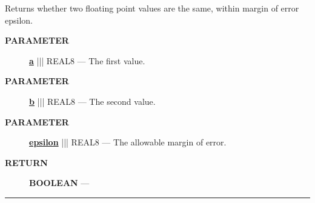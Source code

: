 \par





Returns whether two floating point values are the same, within margin of error epsilon.






\par
\begin{description}
\item [\colorbox{tagtype}{\color{white} \textbf{\textsf{PARAMETER}}}] \textbf{\underline{a}} ||| REAL8 --- The first value.
\item [\colorbox{tagtype}{\color{white} \textbf{\textsf{PARAMETER}}}] \textbf{\underline{b}} ||| REAL8 --- The second value.
\item [\colorbox{tagtype}{\color{white} \textbf{\textsf{PARAMETER}}}] \textbf{\underline{epsilon}} ||| REAL8 --- The allowable margin of error.
\end{description}







\par
\begin{description}
\item [\colorbox{tagtype}{\color{white} \textbf{\textsf{RETURN}}}] \textbf{BOOLEAN} --- 
\end{description}




\rule{\linewidth}{0.5pt}


